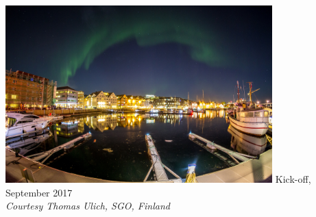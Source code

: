 \begin{frame}[fragile,t]
\frametitle{\hfill}
\vspace{\mytopbit}
\begin{center}
\includegraphics[height=2.7in]{20170907-EOS6D-IMG_5646s.jpg}
\vfill
    {\colblack \ED Kick-off, September 2017} \\
    {\it Courtesy Thomas Ulich, SGO, Finland}
\end{center}
\end{frame}
